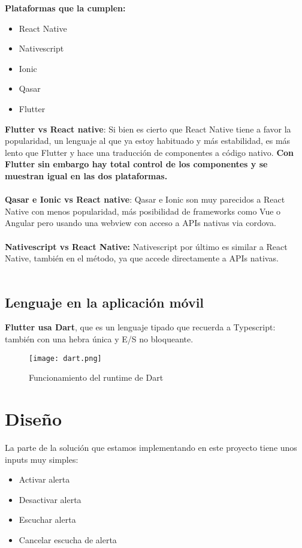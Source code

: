 \textbf{Plataformas que la cumplen: }
\begin{itemize}
  \item React Native
  \item Nativescript
  \item Ionic
  \item Qasar
  \item Flutter
\end{itemize}

\textbf{Flutter vs React native}: Si bien es cierto que React Native tiene a favor la popularidad, un lenguaje al que ya estoy habituado y más estabilidad, es más lento que Flutter y hace una traducción de componentes a código nativo.
\textbf{Con Flutter sin embargo hay total control de los componentes y se muestran igual en las dos plataformas.} \\ \\

\textbf{Qasar e Ionic vs React native}: Qasar e Ionic son muy parecidos a React Native con menos popularidad, más posibilidad de frameworks como Vue o Angular pero usando 
una webview con acceso a APIs nativas via cordova. \\ \\

\textbf{Nativescript vs React Native:} Nativescript por último es similar a React Native, también en el método, ya que accede directamente a APIs nativas. \\ \\

\subsection{Lenguaje en la aplicación móvil}
\textbf{Flutter usa Dart}, que es un lenguaje tipado que recuerda a Typescript: también con una hebra única y E/S no bloqueante.

\begin{figure}[H]
	\centering	
	\texttt{[image: dart.png]}
	\caption{Funcionamiento del runtime de Dart}
	\end{figure}

\section{Diseño}
La parte de la solución que estamos implementando en este proyecto tiene unos inputs muy simples:
\begin{itemize}
	\item Activar alerta
	\item Desactivar alerta
	\item Escuchar alerta
	\item Cancelar escucha de alerta
\end{itemize}

